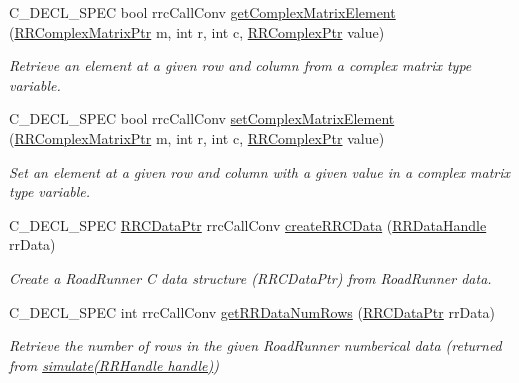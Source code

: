\begin{DoxyCompactItemize}
C\-\_\-\-D\-E\-C\-L\-\_\-\-S\-P\-E\-C bool rrc\-Call\-Conv \hyperlink{group__helper_routines_gaac303b0adb267fb6cbc244106299546e}{get\-Complex\-Matrix\-Element} (\hyperlink{rrc__types_8h_a8cf9e865d8541d100f153800adbb7c3f}{R\-R\-Complex\-Matrix\-Ptr} m, int r, int c, \hyperlink{rrc__types_8h_ada2046d7326c56ae29d8510fbf6622ee}{R\-R\-Complex\-Ptr} value)
\begin{DoxyCompactList}\small\item\em Retrieve an element at a given row and column from a complex matrix type variable. \end{DoxyCompactList}\item 
C\-\_\-\-D\-E\-C\-L\-\_\-\-S\-P\-E\-C bool rrc\-Call\-Conv \hyperlink{group__helper_routines_ga4c1503693a172a994c6d685be5dcda70}{set\-Complex\-Matrix\-Element} (\hyperlink{rrc__types_8h_a8cf9e865d8541d100f153800adbb7c3f}{R\-R\-Complex\-Matrix\-Ptr} m, int r, int c, \hyperlink{rrc__types_8h_ada2046d7326c56ae29d8510fbf6622ee}{R\-R\-Complex\-Ptr} value)
\begin{DoxyCompactList}\small\item\em Set an element at a given row and column with a given value in a complex matrix type variable. \end{DoxyCompactList}\item 
C\-\_\-\-D\-E\-C\-L\-\_\-\-S\-P\-E\-C \hyperlink{rrc__types_8h_a9da8b124eb9c3c0045f8926c6a420b4a}{R\-R\-C\-Data\-Ptr} rrc\-Call\-Conv \hyperlink{group__helper_routines_gaaf161cfff2d85cc5a08ce4fa40d72760}{create\-R\-R\-C\-Data} (\hyperlink{rrc__types_8h_ad0beb6fbdd576789fab9cead01d8b9e9}{R\-R\-Data\-Handle} rr\-Data)
\begin{DoxyCompactList}\small\item\em Create a Road\-Runner C data structure (R\-R\-C\-Data\-Ptr) from Road\-Runner data. \end{DoxyCompactList}\item 
C\-\_\-\-D\-E\-C\-L\-\_\-\-S\-P\-E\-C int rrc\-Call\-Conv \hyperlink{group__helper_routines_gae18768d9447fda2618cacb5099eb768e}{get\-R\-R\-Data\-Num\-Rows} (\hyperlink{rrc__types_8h_a9da8b124eb9c3c0045f8926c6a420b4a}{R\-R\-C\-Data\-Ptr} rr\-Data)
\begin{DoxyCompactList}\small\item\em Retrieve the number of rows in the given Road\-Runner numberical data (returned from \hyperlink{group__simulation_gabbfb1f6f19c777c59fccf8c453c874f7}{simulate(\-R\-R\-Handle handle)}) \end{DoxyCompactList}\item 

\end{DoxyCompactItemize}
